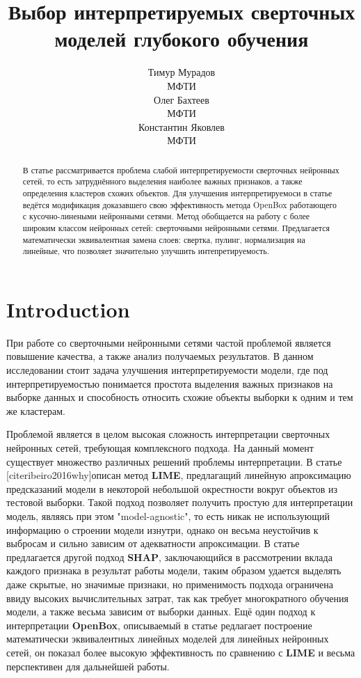 \documentclass{article}
\title{Выбор интерпретируемых сверточных моделей глубокого обучения}
\author{ Тимур Мурадов\\
	МФТИ\\
	\And
	Олег Бахтеев \\
	МФТИ\\
	\And
	Константин Яковлев \\
	МФТИ\\
}
\date{}
\begin{document}
\maketitle

\begin{abstract}
	В статье рассматривается проблема слабой интерпретируемости сверточных нейронных сетей, то есть затруднённого выделения наиболее важных признаков, а также определения кластеров схожих объектов. Для улучшения интерпретируемоси в статье ведётся модификация доказавшего свою эффективность метода OpenBox работающего с  кусочно-линеными нейронными сетями. Метод обобщается на работу с более широким классом нейронных сетей: сверточными нейронными сетями. Предлагается математически эквивалентная замена слоев: свертка, пулинг, нормализация на линейные, что позволяет значительно улучшить интепретируемость.
\end{abstract}



\section{Introduction}
При работе со сверточными нейронными сетями частой проблемой является повышение качества, а также анализ получаемых результатов. В данном исследовании стоит задача улучшения интерпретируемости модели, где под интерпретируемостью понимается простота выделения важных признаков на выборке данных и способность относить схожие объекты выборки к одним и тем же кластерам.

Проблемой является в целом высокая сложность интерпретации сверточных нейронных сетей, требующая комплексного подхода. На данный момент существует множество различных решений проблемы интерпретации. В статье [cite{ribeiro2016why}]описан метод \textbf{LIME}, предлагащий линейную апроксимацию предсказаний модели в некоторой небольшой окрестности вокруг объектов из тестовой выборки. Такой подход позволяет получить простую для интерпретации модель, являясь при этом "model-agnostic", то есть никак не использующий информацию о строении модели изнутри, однако он весьма неустойчив к выбросам и сильно зависим от адекватности апроксимации. В статье \cite{Lundberg2017aunified} предлагается другой подход \textbf{SHAP}, заключающийся в рассмотрении вклада каждого признака в результат работы модели, таким образом удается выделять даже скрытые, но значимые признаки, но применимость подхода ограничена ввиду высоких вычислительных затрат, так как требует многократного обучения модели, а также весьма зависим от выборки данных. Ещё один подход к интерпретации \textbf{OpenBox}, описываемый в статье \cite{chu2019exact} редлагает построение математически эквивалентных линейных моделей для линейных нейронных сетей, он показал более высокую эффективность по сравнению с \textbf{LIME} и весьма перспективен для дальнейшей работы.
\end{document}

